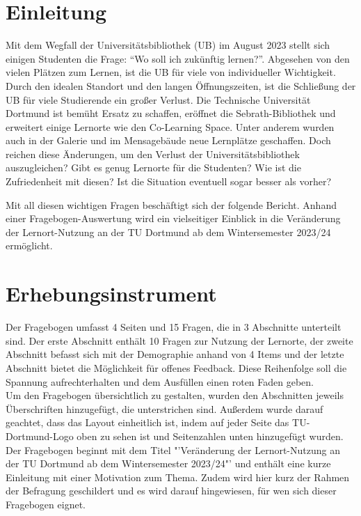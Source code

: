 \documentclass[11pt, a4paper]{article}
\begin{document}
\newpage\null\thispagestyle{empty}\newpage

\newpage
\cleardoublepage%
\section{Einleitung}
\label{Einleitung}
Mit dem Wegfall der Universitätsbibliothek (UB) im August 2023 stellt sich einigen Studenten die Frage: “Wo soll ich zukünftig lernen?”.
Abgesehen von den vielen Plätzen zum Lernen, ist die UB für viele von individueller Wichtigkeit. \cite{.27.01.2024}
Durch den idealen Standort und den langen Öffnungszeiten, ist die Schließung der UB für viele Studierende ein großer Verlust.
Die Technische Universität Dortmund ist bemüht Ersatz zu schaffen, eröffnet die Sebrath-Bibliothek und erweitert einige Lernorte wie den Co-Learning Space.
Unter anderem wurden auch in der Galerie und im Mensagebäude neue Lernplätze geschaffen.
Doch reichen diese Änderungen, um den Verlust der Universitätsbibliothek auszugleichen?
Gibt es genug Lernorte für die Studenten? Wie ist die Zufriedenheit mit diesen?
Ist die Situation eventuell sogar besser als vorher?

Mit all diesen wichtigen Fragen beschäftigt sich der folgende Bericht.
Anhand einer Fragebogen-Auswertung wird ein vielseitiger Einblick in die Veränderung der Lernort-Nutzung an der TU Dortmund ab dem Wintersemester 2023/24 ermöglicht.


\newpage
\section{Erhebungsinstrument}
\label{Erhebungsinstrument}
Der Fragebogen umfasst 4 Seiten und 15 Fragen, die in 3 Abschnitte unterteilt sind. Der erste Abschnitt enthält 10 Fragen zur Nutzung der Lernorte, der zweite Abschnitt befasst sich mit der Demographie anhand von 4 Items und der letzte Abschnitt bietet die Möglichkeit für offenes Feedback. Diese Reihenfolge soll die Spannung aufrechterhalten und dem Ausfüllen einen roten Faden geben.\\

Um den Fragebogen übersichtlich zu gestalten, wurden den Abschnitten jeweils Überschriften hinzugefügt, die unterstrichen sind. Außerdem wurde darauf geachtet, dass das Layout einheitlich ist, indem auf jeder Seite das TU-Dortmund-Logo oben zu sehen ist und Seitenzahlen unten hinzugefügt wurden.
Der Fragebogen beginnt mit dem Titel "'Veränderung der Lernort-Nutzung an der TU Dortmund ab dem Wintersemester 2023/24"' und enthält eine kurze Einleitung mit einer Motivation zum Thema. Zudem wird hier kurz der Rahmen der Befragung geschildert und es wird darauf hingewiesen, für wen sich dieser Fragebogen eignet.\\
\end{document}
